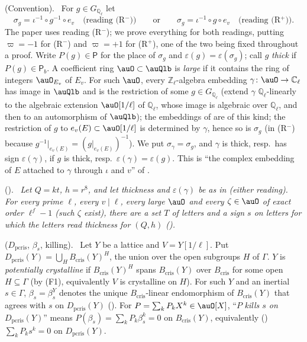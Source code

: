 \documentclass[10pt]{amsart}
\theoremstyle{definition}
\theoremstyle{remark}
\newcommand{\C}{\mathbb C}
\newcommand{\Z}{\mathbb Z}
\newcommand{\Q}{\mathbb Q}
\providecommand{\pkjG}{G_{\Q_\ell}}
\providecommand{\pkjPb}{\mathsf P_b}
\providecommand{\pkjPl}{\mathsf P}
\providecommand{\pkwB}{B_{\mathrm{cris}}}
\providecommand{\pkwD}{D_{\mathrm{pcris}}}
\newenvironment{quotedthm}[2]{\par\medskip\noindent\begingroup
  \textbf{#1}#2.\ \itshape\ignorespaces}{\endgroup\par\medskip}
\newenvironment{quoteddef}[2]{\par\medskip\noindent\begingroup
  \textbf{#1}#2.\ \ignorespaces}{\endgroup\par\medskip}
\begin{document}
\begin{quoteddef}{\cite[Definition~7.1]{P56}}{ (Convention)}
For $g\in\pkjG$ let
\[
\sigma_g=\iota^{-1}\circ g^{-1}\circ e_v\quad\text{(reading (R$^-$))}\qquad\text{or}\qquad
\sigma_g=\iota^{-1}\circ g\circ e_v\quad\text{(reading (R$^+$))}.
\]
The paper uses reading (R$^-$); we prove everything for both readings, putting $\varpi=-1$ for (R$^-$)
and $\varpi=+1$ for (R$^+$), one of the two being fixed throughout a proof. Write
$P(g)\in\pkjPl$ for the place of $\sigma_g$ and $\varepsilon(g)=\varepsilon(\sigma_g)$; call $g$
\emph{thick} if $P(g)\in\pkjPb$. A coefficient ring $\auO\subset\auQlb$ is \emph{large} if it contains
the ring of integers $\auO_{E_v}$ of $E_v$. For such $\auO$, every $\Z_\ell$-algebra embedding $\gamma\colon\auO\to
\C_\ell$ has image in $\auQlb$ and is the restriction of some $g\in\pkjG$ (extend $\gamma$ $\Q_\ell$-linearly to the algebraic extension $\auO[1/\ell]$ of $\Q_\ell$, whose image is algebraic over $\Q_\ell$, and then to an automorphism of $\auQlb$); the embeddings of {\cite[Proposition~2.9]{P56}} are of this kind; the restriction of $g$ to
$e_v(E)\subset\auO[1/\ell]$ is determined by $\gamma$, hence so is $\sigma_g$ (in (R$^-$) because
$g^{-1}|_{e_v(E)}=(g|_{e_v(E)})^{-1}$). We put $\sigma_\gamma=\sigma_g$, and $\gamma$ is thick,
resp.\ has sign $\varepsilon(\gamma)$, if $g$ is thick, resp.\ $\varepsilon(\gamma)=\varepsilon(g)$.
This is ``the complex embedding of $E$ attached to $\gamma$ through $\iota$ and $v$'' of
{\cite[Proposition~2.9]{P56}}.
\end{quoteddef}

\begin{quotedthm}{\cite[Theorem~7.9]{P56}}{ ({\cite[Proposition~2.9]{P56}})}
Let $Q=kt$, $h=r^8$, and let thickness and $\varepsilon(\gamma)$ be as in {\cite[Convention~7.1]{P56}}
(either reading). For every prime $\ell$, every $v\mid\ell$, every large $\auO$ and every
$\zeta\in\auO$ of exact order $\ell^f-1$ (such $\zeta$ exist), there are a set $T$ of letters and a sign
$s$ on letters for which the letters read thickness for $(Q,h)$ ({\cite[Definition~2.4]{P56}}).
\end{quotedthm}

\begin{quoteddef}{\cite[Definition~9.2]{P56}}{ ($D_{\mathrm{pcris}}$, $\beta_s$, killing)}
Let $Y$ be a lattice and $V=Y[1/\ell]$. Put $\pkwD(Y)=\bigcup_H\pkwB(Y)^H$, the union over the open
subgroups $H$ of $\Gamma$. $Y$ is \emph{potentially crystalline} if $\pkwB(Y)^H$ spans $\pkwB(Y)$ over
$\pkwB$ for some open $H\subseteq\Gamma$ (by (F1), equivalently $V$ is crystalline on $H$). For such $Y$
and an inertial $s\in\Gamma$, $\beta_s=\beta_s^Y$ denotes the unique $\pkwB$-linear endomorphism of
$\pkwB(Y)$ that agrees with $s$ on $\pkwD(Y)$ ({\cite[Lemma~9.3(i)]{P56}}). For $P=\sum_kP_kX^k\in\auO[X]$,
``$P$ \emph{kills $s$ on $\pkwD(Y)$}'' means $P(\beta_s)=\sum_kP_k\beta_s^k=0$ on $\pkwB(Y)$,
equivalently ({\cite[Lemma~9.3(i)]{P56}}) $\sum_kP_ks^k=0$ on $\pkwD(Y)$.
\end{quoteddef}
\end{document}
